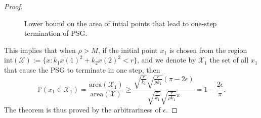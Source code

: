 \documentclass[10pt,a4paper]{amsart}
\begin{document}
\begin{proof}
\begin{figure}[h]
		\vspace{2mm}
		\caption{Lower bound on the area of intial points that lead to one-step termination of PSG.}
		\label{fig7}
	\end{figure}

	This implies that when $\rho > M$, if the initial point $x_1$ is chosen from the region $\text{int}(\mathcal{X}) := \{ x : k_1 x(1)^2 + k_2 x(2)^2 < r \}$, and we denote by $\mathcal{X}_1$ the set of all $x_1$ that cause the PSG to terminate in one step, then
	\begin{equation*}
		\mathbb{P}\left(x_1 \in \mathcal{X}_1\right) = \dfrac{\text{area}(\mathcal{X}_1)}{\text{area}(\mathcal{X})} \geq \dfrac{\sqrt{\frac{r}{k_1}}\sqrt{\frac{r}{\rho k_1}}(\pi-2\epsilon)}{\sqrt{\frac{r}{k_1}}\sqrt{\frac{r}{\rho k_1}}\pi} = 1 - \frac{2\epsilon}{\pi}.
	\end{equation*}
	The theorem is thus proved by the arbitrariness of $\epsilon$.
\end{proof}
\end{document}
